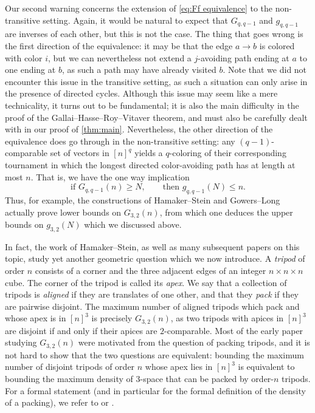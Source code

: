 \documentclass[11pt,reqno]{amsart}
\theoremstyle{definition}
\newcommand\1{\mathbf{1}}
\let\leq\leqslant
\let\geq\geqslant
\begin{document}
Our second warning concerns the extension of \eqref{eq:Ff equivalence} to the non-transitive setting. Again, it would be natural to expect that $G_{q,q-1}$ and $g_{q,q-1}$ are inverses of each other, but this is not the case. The thing that goes wrong is the first direction of the equivalence: it may be that the edge $a\to b$ is colored with color $i$, but we can nevertheless not extend a $j$-avoiding path ending at $a$ to one ending at $b$, as such a path may have already visited $b$. Note that we did not encounter this issue in the transitive setting, as such a situation can only arise in the presence of directed cycles. Although this issue may seem like a mere technicality, it turns out to be fundamental; it is also the main difficulty in the proof of the Gallai--Hasse--Roy--Vitaver theorem, and must also be carefully dealt with in our proof of \cref{thm:main}. Nevertheless, the other direction of the equivalence does go through in the non-transitive setting: any $(q-1)$-comparable set of vectors in $[n]^q$ yields a $q$-coloring of their corresponding tournament in which the longest directed color-avoiding path has at length at most $n$. That is, we have the one way implication
\begin{equation}\label{eq:Gg equivalence}
    \text{if }G_{q,q-1}(n) \geq N, \qquad \text{then }g_{q,q-1}(N) \leq n.
\end{equation}
Thus, for example, the constructions of Hamaker--Stein \cite{MR754867} and Gowers--Long \cite{MR4298506} actually prove lower bounds on $G_{3,2}(n)$, from which one deduces the upper bounds on $g_{3,2}(N)$ which we discussed above.

In fact, the work of Hamaker--Stein, as well as many  subsequent papers on this topic, study yet another geometric question which we now introduce. 
A {\it tripod} of order $n$ consists of a corner and the three adjacent edges of an integer $n \times n \times n$ cube. The corner of the tripod is called its \textit{apex}. We say that a collection of tripods is \textit{aligned} if they are translates of one other, and that they \emph{pack} if they are pairwise disjoint. The maximum number of aligned tripods which pack and whose apex is in $[n]^3$ is precisely $G_{3,2}(n)$, as two tripods with apices in $[n]^3$ are disjoint if and only if their apices are $2$-comparable. 
Most of the early paper studying $G_{3,2}(n)$ were motivated
from the question of packing tripods, 
and it is not hard to show that the two questions are equivalent: bounding the maximum number of disjoint tripods of order $n$ whose apex lies in $[n]^3$ is equivalent to bounding the maximum density of $3$-space that can be packed by order-$n$ tripods. For a formal statement (and in particular for the formal definition of the density of a packing), we refer to \cite[Chapter 4]{MR1311249} or \cite{MR754866}. 
\end{document}

